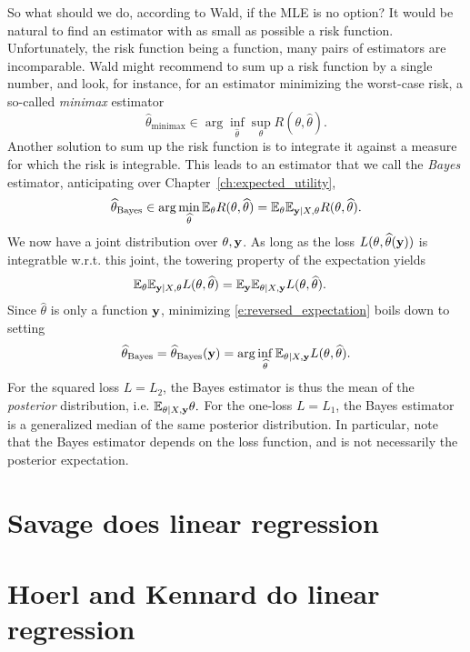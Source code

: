 So what should we do, according to Wald, if the MLE is no option? 
It would be natural to find an estimator with as small as possible a risk function.
Unfortunately, the risk function being a function, many pairs of estimators are incomparable. 
Wald might recommend to sum up a risk function by a single number, and look, for instance, for an estimator minimizing the worst-case risk, a so-called \emph{minimax} estimator
\begin{equation}
    \widehat\theta_{\text{minimax}} \in \arg\inf_{\widehat{\theta}} \sup_\theta R(\theta,\widehat{\theta}).
    \label{e:minimax_estimator_for_regression}
\end{equation}
Another solution to sum up the risk function is to integrate it against a measure for which the risk is integrable. 
This leads to an estimator that we call the \emph{Bayes} estimator, anticipating over Chapter~\ref{ch:expected_utility},
\begin{equation}
    \widehat{\theta}_{\text{Bayes}} \in \arg\min_{\widehat{\theta}} \mathbb{E}_\theta R(\theta,\widehat{\theta}) = \mathbb{E}_\theta \mathbb{E}_{\mathbf{y}\vert X,\theta} R(\theta,\widehat{\theta}).
    \label{e:bayes_estimator_for_regression}
\end{equation}
We now have a joint distribution over $\theta,\mathbf{y}$. 
As long as the loss $L(\theta,\widehat{\theta}(\mathbf{y}))$ is integratble w.r.t. this joint, the towering property of the expectation yields
\begin{align}
    \mathbb{E}_\theta \mathbb{E}_{\mathbf{y}\vert X,\theta} L(\theta,\widehat{\theta}) 
    &= \mathbb{E}_{\mathbf{y}} \mathbb{E}_{\theta\vert X,\mathbf{y}} L(\theta,\widehat{\theta}).
\label{e:reversed_expectation}
\end{align}
Since $\widehat{\theta}$ is only a function $\mathbf{y}$, minimizing \eqref{e:reversed_expectation} boils down to setting 
$$
\widehat{\theta}_{\text{Bayes}} = \widehat{\theta}_{\text{Bayes}}(\mathbf{y}) = \arg\inf_{\widehat{\theta}} \mathbb{E}_{\theta\vert X,\mathbf{y}} L(\theta,\widehat{\theta}).
$$
For the squared loss $L=L_2$, the Bayes estimator is thus the mean of the \emph{posterior} distribution, i.e. 
$
\mathbb{E}_{\theta\vert X,\mathbf{y}} \theta. 
$
For the one-loss $L=L_1$, the Bayes estimator is a generalized median of the same posterior distribution.
In particular, note that the Bayes estimator depends on the loss function, and is not necessarily the posterior expectation.

\section{Savage does linear regression}
\label{ch:bayesian_regression}

\section{Hoerl and Kennard do linear regression}
\label{ch:penalized_regression}
